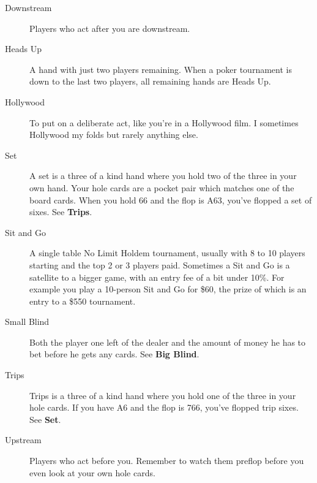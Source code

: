 \begin{description}
\item[Downstream] Players who act after you are downstream.

\item[Heads Up] A hand with just two players remaining. When a poker tournament
is down to the last two players, all remaining hands are Heads Up.

\item[Hollywood] To put on a deliberate act, like you're in a Hollywood film. I
sometimes Hollywood my folds but rarely anything else.

\item[Set] A set is a three of a kind hand where you hold two of the three in your
own hand. Your hole cards are a pocket pair which matches one of the board cards.
When you hold 66 and the flop is A63, you've flopped a set of sixes. See \textbf{Trips}.

\item[Sit and Go] A single table No Limit Holdem tournament, usually with 8 to 10
players starting and the top 2 or 3 players paid. Sometimes a Sit and Go is
a satellite to a bigger game, with an entry fee of a bit under 10\%. For
example you play a 10-person Sit and Go for \$60, the prize of which
is an entry to a \$550 tournament.

\item[Small Blind] Both the player one left of the dealer and the amount of money he
has to bet before he gets any cards. See \textbf{Big Blind}.

\item[Trips] Trips is a three of a kind hand where you hold one of the three in your
hole cards. If you have A6 and the flop is 766, you've flopped trip sixes. See \textbf{Set}.

\item[Upstream] Players who act before you. Remember to watch them preflop before
you even look at your own hole cards.

\end{description}
